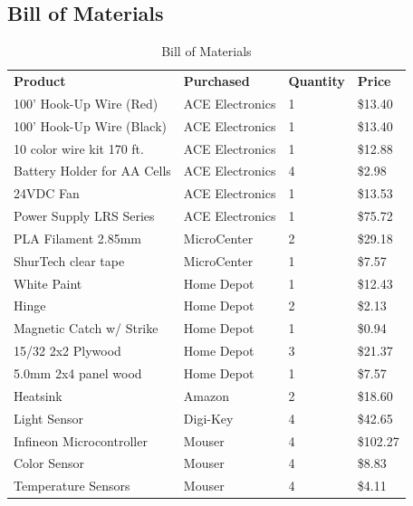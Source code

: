 \documentclass[12pt,a4paper]{report}
\begin{document}
\subsection{Bill of Materials}

\begin{table}[H]
\caption {Bill of Materials}
\label{tab:title}
\begin{center}
\begin{tabular}{llll}
\textbf{Product}              & \textbf{Purchased} & \textbf{Quantity} & \textbf{Price}    \\
100' Hook-Up Wire (Red)       & ACE Electronics & 1        & \$13.40  \\
100' Hook-Up Wire (Black)     & ACE Electronics & 1        & \$13.40  \\
10 color wire kit 170 ft.     & ACE Electronics & 1        & \$12.88  \\
Battery Holder for AA Cells   & ACE Electronics & 4        & \$2.98   \\
24VDC Fan                     & ACE Electronics & 1        & \$13.53  \\
Power Supply LRS Series       & ACE Electronics & 1        & \$75.72  \\
PLA Filament 2.85mm           & MicroCenter     & 2        & \$29.18  \\
ShurTech clear tape           & MicroCenter     & 1        & \$7.57   \\
White Paint                   & Home Depot      & 1        & \$12.43  \\
Hinge                         & Home Depot      & 2        & \$2.13   \\
Magnetic Catch w/ Strike      & Home Depot      & 1        & \$0.94   \\
15/32 2x2 Plywood             & Home Depot      & 3        & \$21.37  \\
5.0mm 2x4 panel wood          & Home Depot      & 1        & \$7.57   \\
Heatsink                      & Amazon          & 2        & \$18.60  \\
Light Sensor                  & Digi-Key        & 4        & \$42.65  \\
Infineon Microcontroller      & Mouser          & 4        & \$102.27 \\
Color Sensor                  & Mouser          & 4        & \$8.83   \\
Temperature Sensors           & Mouser          & 4        & \$4.11   \\

\end{tabular}
\end{center}
\end{table}
\end{document}
